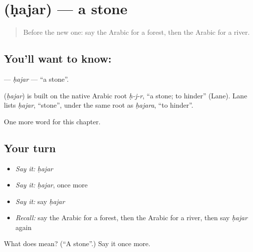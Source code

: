 \section[\texorpdfstring{\ar{حجر} (ḥajar)}{حجر (ḥajar)}]{ (ḥajar) — a stone}

\label{lesson:AR-C76-hajar}



\begin{quote}
Before the new one: say the Arabic for a forest, then the Arabic for a river.
\end{quote}

\subsection*{You'll want to know: }
\textbf{} — \emph{ḥajar} — \textquotedblleft{}a stone\textquotedblright{}.

\begin{cousinweb}
\textbf{} (\emph{ḥajar}) is built on the native Arabic root \emph{ḥ-j-r}, \textquotedblleft{}a stone; to hinder\textquotedblright{} (Lane). Lane lists \emph{ḥajar}, \textquotedblleft{}stone\textquotedblright{}, under the same root as \emph{ḥajara}, \textquotedblleft{}to hinder\textquotedblright{}.
\end{cousinweb}

\begin{grammarlens}[title={What you've built}]
One more word for this chapter.
\end{grammarlens}

\subsection*{Your turn}
\begin{itemize}
\raggedright
  \item \emph{Say it:} \emph{ḥajar}
  \item \emph{Say it:} \emph{ḥajar}, once more
  \item \emph{Say it:} say \emph{ḥajar}
  \item \emph{Recall:} say the Arabic for a forest, then the Arabic for a river, then say \emph{ḥajar} again
\end{itemize}

\begin{tcolorbox}[breakable,colback=teal!4,colframe=teal!35!black,title={Before you move on}]
What does  mean? (\textquotedblleft{}A stone\textquotedblright{}.) Say it once more.
\end{tcolorbox}
